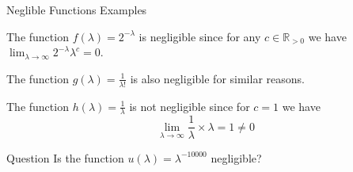 \documentclass{beamer}
\begin{document}
    \begin{frame}{Neglible Functions Examples}
        \begin{example}
            The function $f(\lambda) = 2^{-\lambda}$ is negligible since for any $c \in \mathbb{R}_{>0}$ we have $\lim_{\lambda \to \infty} 2^{-\lambda}\lambda^c = 0$.\pause
        
            The function $g(\lambda) = \frac{1}{\lambda!}$ is also negligible for similar reasons.\pause
        \end{example}
        
        \begin{example}
            The function $h(\lambda) = \frac{1}{\lambda}$ is not negligible since for $c = 1$ we have
            \begin{equation*}
                \lim_{\lambda \to \infty} \frac{1}{\lambda} \times \lambda = 1 \neq 0
            \end{equation*}
        \end{example}

        \pause\begin{alertblock}{Question}
            Is the function $u(\lambda) = \lambda^{-10000}$ negligible?
        \end{alertblock}
    \end{frame}
\end{document}

